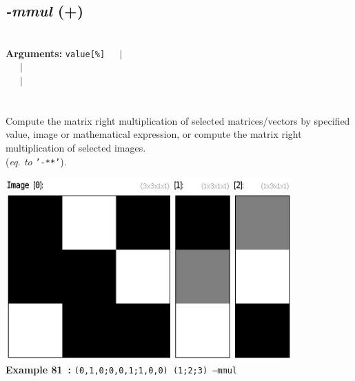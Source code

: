 \documentclass[a4paper,11pt,twoside]{book}
\begin{document}
\subsection{\emph{-mmul} (+)}\vspace*{-0.5em}
~\\\textbf{Arguments: } 
{\small \texttt{value[\%]}}~~~$|$\\
\hspace*{2.2cm}{\small \texttt{[image]}}~~~$|$\\
~~~$|$\\
\\~\\
Compute the matrix right multiplication of selected matrices/vectors by specified value, image or
mathematical expression, or compute the matrix right multiplication of selected images.
~\\(\emph{eq. to} {\small \texttt{'-**'}}).
\begin{center}\includegraphics[keepaspectratio=true,height=7cm,width=\textwidth]{img/gmic_def81.jpg}\\
{\footnotesize \textbf{Example 81~:} \texttt{(0,1,0;0,0,1;1,0,0) (1;2;3) --mmul}}
\end{center}
\end{document}

